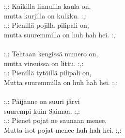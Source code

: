 
            :,: Kaikilla linnuilla kaula on,  \\
            mutta kurjilla on kulkku. :,:  \\
            :,: Pienillä pojilla pilipali on,  \\
            mutta suuremmilla on huh hah hei. :,: \\
\hspace{10mm} \\
            :,: Tehtaan kengissä numero on,  \\
            mutta virsuissa on littu. :,: \\
            :,: Pienillä tytöillä pilipali on,  \\
            Mutta suuremmilla on huh hah hei. :,: \\
\hspace{10mm} \\
            :,: Päijänne on suuri järvi \\
            suurempi kuin Saimaa. :,: \\
            :,: Pienet pojat ne saunaan menee, \\
            Mutta isot pojat menee huh hah hei. :,: \\
